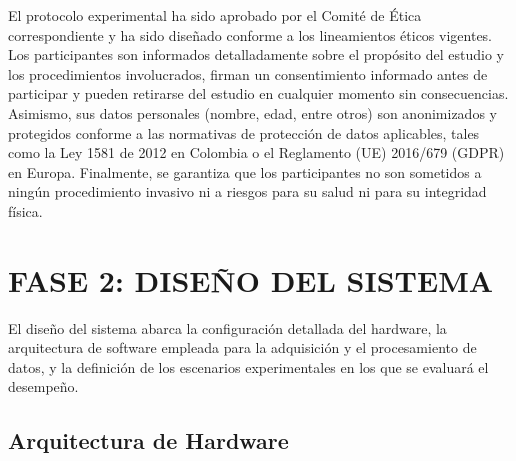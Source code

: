 El protocolo experimental ha sido aprobado por el Comité de Ética correspondiente y ha sido diseñado conforme a los lineamientos éticos vigentes. Los participantes son informados detalladamente sobre el propósito del estudio y los procedimientos involucrados, firman un consentimiento informado antes de participar y pueden retirarse del estudio en cualquier momento sin consecuencias. Asimismo, sus datos personales (nombre, edad, entre otros) son anonimizados y protegidos conforme a las normativas de protección de datos aplicables, tales como la Ley 1581 de 2012 en Colombia o el Reglamento (UE) 2016/679 (GDPR) en Europa. Finalmente, se garantiza que los participantes no son sometidos a ningún procedimiento invasivo ni a riesgos para su salud ni para su integridad física.

\section{FASE 2: DISEÑO DEL SISTEMA}
\label{sec:diseno_sistema}

El diseño del sistema abarca la configuración detallada del hardware, la arquitectura de software empleada para la adquisición y el procesamiento de datos, y la definición de los escenarios experimentales en los que se evaluará el desempeño.

\subsection{Arquitectura de Hardware}
\label{subsec:arquitectura_hardware}

